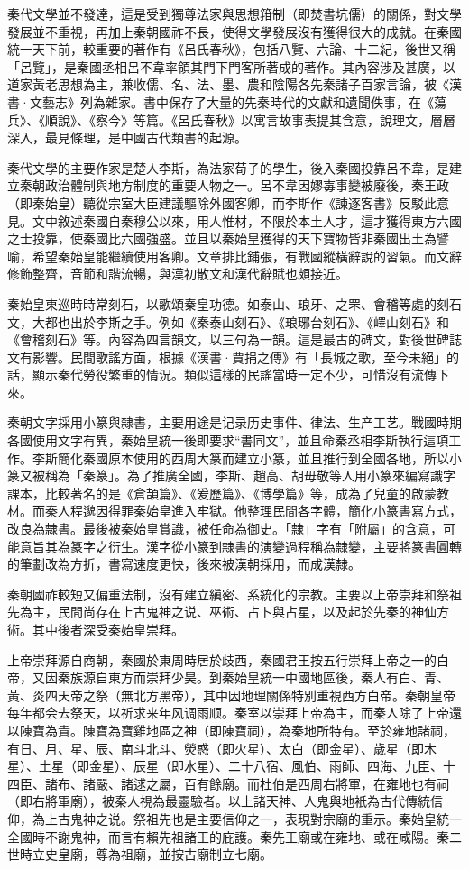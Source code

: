 秦代文學並不發達，這是受到獨尊法家與思想箝制（即焚書坑儒）的關係，對文學發展並不重視，再加上秦朝國祚不長，使得文學發展沒有獲得很大的成就。在秦國統一天下前，較重要的著作有《呂氏春秋》，包括八覽、六論、十二紀，後世又稱「呂覽」，是秦國丞相呂不韋率領其門下門客所著成的著作。其內容涉及甚廣，以道家黃老思想為主，兼收儒、名、法、墨、農和陰陽各先秦諸子百家言論，被《漢書·文藝志》列為雜家。書中保存了大量的先秦時代的文獻和遺聞佚事，在《蕩兵》、《順說》、《察今》等篇。《呂氏春秋》以寓言故事表提其含意，說理文，層層深入，最見條理，是中國古代類書的起源。

秦代文學的主要作家是楚人李斯，為法家荀子的學生，後入秦國投靠呂不韋，是建立秦朝政治體制與地方制度的重要人物之一。呂不韋因嫪毐事變被廢後，秦王政（即秦始皇）聽從宗室大臣建議驅除外國客卿，而李斯作《諫逐客書》反駁此意見。文中敘述秦國自秦穆公以來，用人惟材，不限於本土人才，這才獲得東方六國之士投靠，使秦國比六國強盛。並且以秦始皇獲得的天下寶物皆非秦國出土為譬喻，希望秦始皇能繼續使用客卿。文章排比鋪張，有戰國縱橫辭說的習氣。而文辭修飾整齊，音節和諧流暢，與漢初散文和漢代辭賦也頗接近。

秦始皇東巡時時常刻石，以歌頌秦皇功德。如泰山、琅牙、之罘、會稽等處的刻石文，大都也出於李斯之手。例如《秦泰山刻石》、《琅琊台刻石》、《嶧山刻石》和《會稽刻石》等。內容為四言韻文，以三句為一韻。這是最古的碑文，對後世碑誌文有影響。民間歌謠方面，根據《漢書·賈捐之傳》有「長城之歌，至今未絕」的話，顯示秦代勞役繁重的情況。類似這樣的民謠當時一定不少，可惜沒有流傳下來。

秦朝文字採用小篆與隸書，主要用途是记录历史事件、律法、生产工艺。戰國時期各國使用文字有異，秦始皇統一後即要求“書同文”，並且命秦丞相李斯執行這項工作。李斯簡化秦國原本使用的西周大篆而建立小篆，並且推行到全國各地，所以小篆又被稱為「秦篆」。為了推廣全國，李斯、趙高、胡毋敬等人用小篆來編寫識字課本，比較著名的是《倉頡篇》、《爰歷篇》、《博學篇》等，成為了兒童的啟蒙教材。而秦人程邈因得罪秦始皇進入牢獄。他整理民間各字體，簡化小篆書寫方式，改良為隸書。最後被秦始皇賞識，被任命為御史。「隸」字有「附屬」的含意，可能意旨其為篆字之衍生。漢字從小篆到隸書的演變過程稱為隸變，主要將篆書圓轉的筆劃改為方折，書寫速度更快，後來被漢朝採用，而成漢隸。

秦朝國祚較短又偏重法制，沒有建立縝密、系統化的宗教。主要以上帝崇拜和祭祖先為主，民間尚存在上古鬼神之说、巫術、占卜與占星，以及起於先秦的神仙方術。其中後者深受秦始皇崇拜。

上帝崇拜源自商朝，秦國於東周時居於歧西，秦國君王按五行崇拜上帝之一的白帝，又因秦族源自東方而崇拜少昊。到秦始皇統一中國地區後，秦人有白、青、黃、炎四天帝之祭（無北方黑帝），其中因地理關係特別重視西方白帝。秦朝皇帝每年都会去祭天，以祈求来年风调雨顺。秦室以崇拜上帝為主，而秦人除了上帝還以陳寶為貴。陳寶為寶雞地區之神（即陳寶祠），為秦地所特有。至於雍地諸祠，有日、月、星、辰、南斗北斗、熒惑（即火星）、太白（即金星）、歲星（即木星）、土星（即金星）、辰星（即水星）、二十八宿、風伯、雨師、四海、九臣、十四臣、諸布、諸嚴、諸逑之屬，百有餘廟。而杜伯是西周右將軍，在雍地也有祠（即右將軍廟），被秦人視為最靈驗者。以上諸天神、人鬼與地衹為古代傳統信仰，為上古鬼神之说。祭祖先也是主要信仰之一，表現對宗廟的重示。秦始皇統一全國時不謝鬼神，而言有賴先祖諸王的庇護。秦先王廟或在雍地、或在咸陽。秦二世時立史皇廟，尊為祖廟，並按古廟制立七廟。

